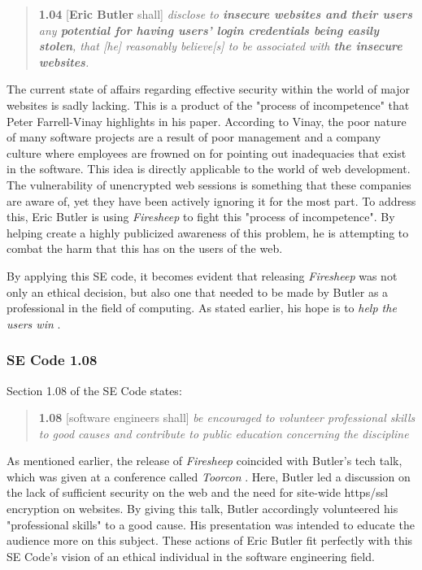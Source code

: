 \documentclass[11pt]{article}
\begin{document}
\begin{multicols}{2}
\begin{quote}
  \textbf{1.04} [\textbf{Eric Butler} shall] \emph{disclose to \textbf{insecure websites and their users} any \textbf{potential for having users' login credentials being easily stolen}, that [he] reasonably believe[s] to be associated with \textbf{the insecure websites}.}
\end{quote}

The current state of affairs regarding effective security within the world of major websites is sadly lacking. This is a product of the "process of incompetence" that Peter Farrell-Vinay \cite{incompetence} highlights in his paper. According to Vinay, the poor nature of many software projects are a result of poor management and a company culture where employees are frowned on for pointing out inadequacies that exist in the software. This idea is directly applicable to the world of web development. The vulnerability of unencrypted web sessions is something that these companies are aware of, yet they have been actively ignoring it for the most part. To address this, Eric Butler is using \emph{Firesheep} to fight this "process of incompetence". By helping create a highly publicized awareness of this problem, he is attempting to combat the harm that this has on the users of the web.

By applying this SE code, it becomes evident that releasing \emph{Firesheep} was not only an ethical decision, but also one that needed to be made by Butler as a professional in the field of computing. As stated earlier, his hope is to \emph{help the users win} \cite{codebutler_main}.

\subsubsection{SE Code 1.08}
Section 1.08 of the SE Code states:

\begin{quote}
  \textbf{1.08} [software engineers shall] \emph{be encouraged to volunteer professional skills to good causes and contribute to public education concerning the discipline} \cite{se_code}
\end{quote}

As mentioned earlier, the release of \emph{Firesheep} coincided with Butler's tech talk, which was given at a conference called \emph{Toorcon} \cite{codebutler_main}. Here, Butler led a discussion on the lack of sufficient security on the web and the need for site-wide https/ssl encryption on websites. By giving this talk, Butler accordingly volunteered his "professional skills" to a good cause. His presentation was intended to educate the audience more on this subject. These actions of Eric Butler fit perfectly with this SE Code's vision of an ethical individual in the software engineering field.

\end{multicols}
\end{document}
